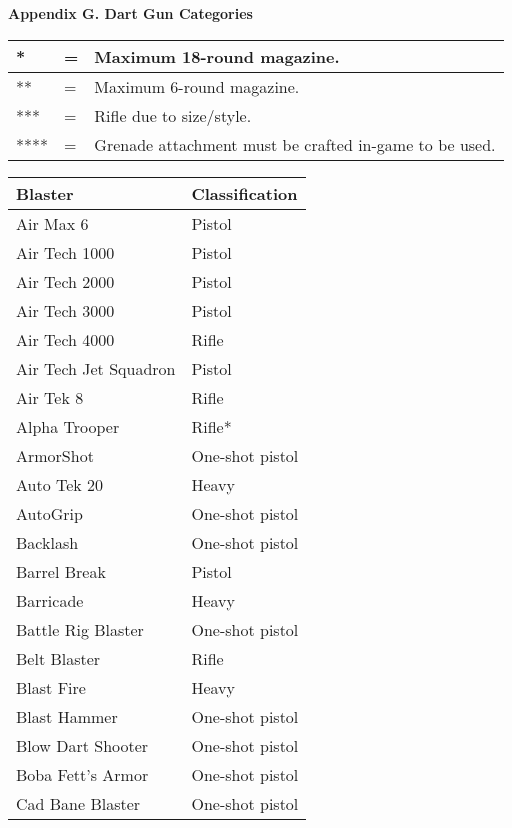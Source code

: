 \documentclass{scrbook}
\begin{document}
\begin{table}
\end{table}

\textbf{Appendix G. Dart Gun Categories}

\begin{table}
\begin{tabular}{|l|l|l|} \hline 
* & = & Maximum 18-round magazine. \\
 \hline ** & = & Maximum 6-round magazine. \\
 \hline *** & = & Rifle due to size/style. \\
 \hline **** & = & Grenade attachment must be crafted in-game to be used. \\
 \hline \end{tabular}

\end{table}

\begin{table}
\begin{tabular}{|l|l|} \hline 
Blaster & Classification \\
 \hline Air Max 6 & Pistol \\
 \hline Air Tech 1000 & Pistol \\
 \hline Air Tech 2000 & Pistol \\
 \hline Air Tech 3000 & Pistol \\
 \hline Air Tech 4000 & Rifle \\
 \hline Air Tech Jet Squadron & Pistol \\
 \hline Air Tek 8 & Rifle \\
 \hline Alpha Trooper & Rifle* \\
 \hline ArmorShot & One-shot pistol \\
 \hline Auto Tek 20 & Heavy \\
 \hline AutoGrip & One-shot pistol \\
 \hline Backlash & One-shot pistol \\
 \hline Barrel Break & Pistol \\
 \hline Barricade & Heavy \\
 \hline Battle Rig Blaster & One-shot pistol \\
 \hline Belt Blaster & Rifle \\
 \hline Blast Fire & Heavy \\
 \hline Blast Hammer & One-shot pistol \\
 \hline Blow Dart Shooter & One-shot pistol \\
 \hline Boba Fett's Armor & One-shot pistol \\
 \hline Cad Bane Blaster & One-shot pistol \\

\end{tabular}
\end{table}
\end{document}
